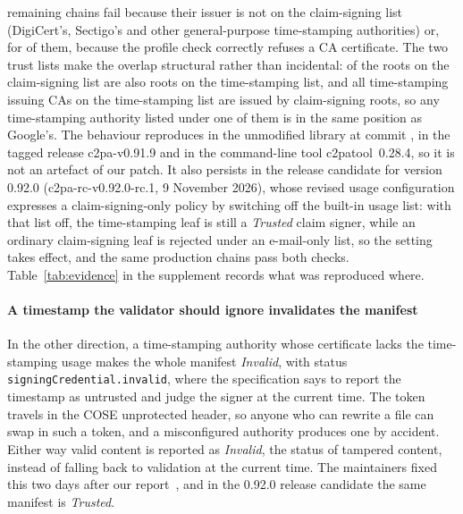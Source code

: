 remaining chains fail because their issuer is not on the claim-signing list
(DigiCert's, Sectigo's and other general-purpose time-stamping authorities) or,
for \NtpcCaRej{} of them, because the profile check correctly refuses a CA
certificate. The two trust lists make the overlap structural rather than
incidental: \NtlBothLists{} of the \NtlClaimRoots{} roots on the claim-signing
list are also roots on the time-stamping list, and all \NtsaIcaUnderClaim{}
time-stamping issuing CAs on the time-stamping list are issued by claim-signing
roots, so any time-stamping authority listed under one of them is in the same
position as Google's. The behaviour reproduces in the unmodified library at commit
\texttt{\NvalCommit}, in the tagged release c2pa-v0.91.9 and in the
command-line tool c2patool~0.28.4, so it is not an artefact of our patch. It
also persists in the release candidate for version 0.92.0
(c2pa-rc-v0.92.0-rc.1, 9 November 2026), whose revised usage configuration
expresses a claim-signing-only policy by switching off the built-in usage
list: with that list off, the time-stamping leaf is still a \emph{Trusted}
claim signer, while an ordinary claim-signing leaf is rejected under an
e-mail-only list, so the setting takes effect, and the same \NtpcStrong{}
production chains pass both checks. Table~\ref{tab:evidence} in the
supplement records what was reproduced where.

\paragraph{A timestamp the validator should ignore invalidates the manifest}
In the other direction, a time-stamping authority whose certificate lacks the
time-stamping usage makes the whole manifest \emph{Invalid}, with status
\texttt{signingCredential.invalid}, where the specification says to report the
timestamp as untrusted and judge the signer at the current time. The token
travels in the COSE unprotected header, so anyone who can rewrite a file can
swap in such a token, and a misconfigured authority produces one by accident.
Either way valid content is reported as \emph{Invalid}, the status of
tampered content, instead of falling back to validation at the current time.
The maintainers fixed this two days after our report~\cite{c2pars3005}, and
in the 0.92.0 release candidate the same manifest is \emph{Trusted}.

